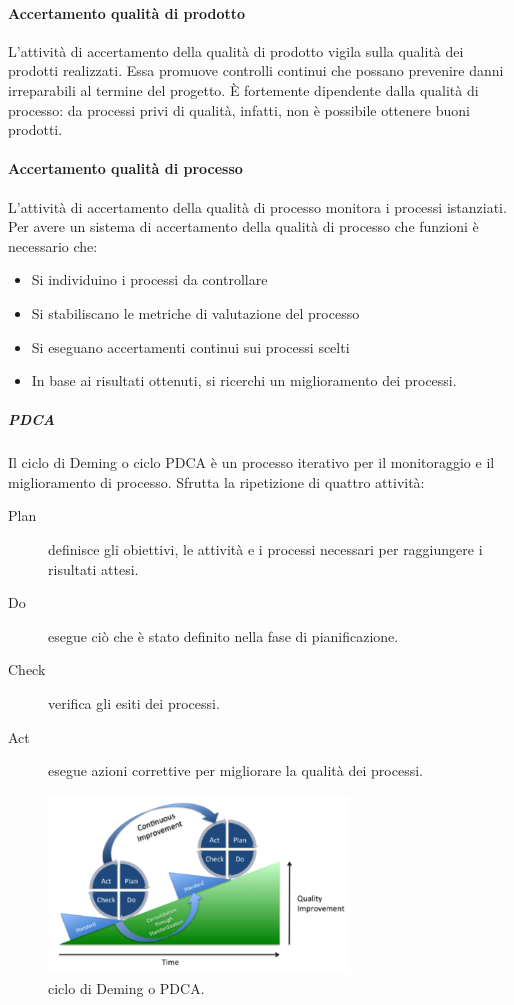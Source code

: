 \documentclass[../norme-di-progetto.tex]{subfiles}
\begin{document}
\paragraph{Accertamento qualità di prodotto}%
\label{par:accertamento_qualita_di_prodotto}
L'attività di accertamento della qualità di prodotto vigila sulla qualità dei prodotti realizzati. Essa promuove controlli continui che possano prevenire danni irreparabili al termine del progetto. È fortemente dipendente dalla qualità di processo: da processi privi di qualità, infatti, non è possibile ottenere buoni prodotti.

\paragraph{Accertamento qualità di processo}%
\label{par:accertamento_qualita_di_processo}
L'attività di accertamento della qualità di processo monitora i processi istanziati. Per avere un sistema di accertamento della qualità di processo che funzioni è necessario che:

\begin{itemize}
  \item Si individuino i processi da controllare
  \item Si stabiliscano le metriche di valutazione del processo
  \item Si eseguano accertamenti continui sui processi scelti
  \item In base ai risultati ottenuti, si ricerchi un miglioramento dei processi.
\end{itemize}

\subparagraph{PDCA}%
\label{subp:PDCA}
Il ciclo di Deming o ciclo PDCA è un processo iterativo per il monitoraggio e il miglioramento di processo. Sfrutta la ripetizione di quattro attività:

\begin{description}
  \item [Plan] definisce gli obiettivi, le attività e i processi necessari per raggiungere i risultati attesi.
  \item [Do] esegue ciò che è stato definito nella fase di pianificazione.
  \item [Check] verifica gli esiti dei processi.
  \item [Act] esegue azioni correttive per migliorare la qualità dei processi.
\end{description}
\begin{figure}[H]
  \includegraphics[width=8cm]{PDCA-process.png}
  \centering
  \caption{ciclo di Deming o PDCA.}
\end{figure}
\end{document}
